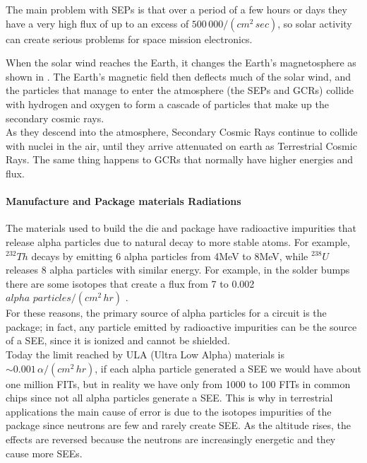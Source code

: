 {{{{{					The main problem with SEPs is that over a period of a few hours or days they have a very high flux of up to an excess of $500\,000/(cm^2\,sec)$, so solar activity can create serious problems for space mission electronics.
		
					When the solar wind reaches the Earth, it changes the Earth's magnetosphere as shown in . The Earth's magnetic field then deflects much of the solar wind, and the particles that manage to enter the atmosphere (the SEPs and GCRs) collide with hydrogen and oxygen to form a cascade of particles that make up the secondary cosmic rays. \\
					
					As they descend into the atmosphere, Secondary Cosmic Rays continue to collide with nuclei in the air, until they arrive attenuated on earth as Terrestrial Cosmic Rays. The same thing happens to GCRs that normally have higher energies and flux.
				}%
			
				\paragraph{Manufacture and Package materials Radiations}{
					The materials used to build the die and package have radioactive impurities that release alpha particles due to natural decay to more stable atoms. For example, $^{232}Th$ decays by emitting 6 alpha particles from 4MeV to 8MeV, while $^{238}U$ releases 8 alpha particles with similar energy. For example, in the solder bumps there are some isotopes that create a flux from 7 to 0.002 $alpha\,\,particles/(cm^2\,hr)$ .\\ 
					
					For these reasons, the primary source of alpha particles for a circuit is the package; in fact, any particle emitted by radioactive impurities can be the source of a SEE, since it is ionized and cannot be shielded.\\
					
					Today the limit reached by ULA (Ultra Low Alpha) materials is $\sim 0.001\,\alpha/(cm^2\,hr)$, if each alpha particle generated a SEE we would have about one million FITs, but in reality we have only from 1000 to 100 FITs in common chips since not all alpha particles generate a SEE. This is why in terrestrial applications the main cause of error is due to the isotopes impurities of the package since neutrons are few and rarely create SEE. As the altitude rises, the effects are reversed because the neutrons are increasingly energetic and they cause more SEEs.  
					
}}}}}

